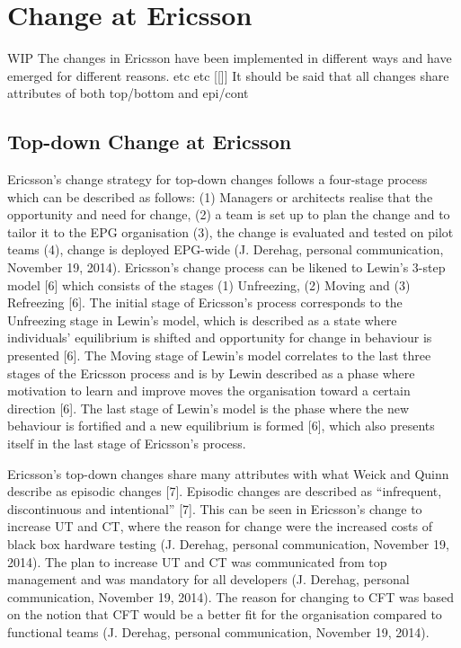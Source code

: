 \documentclass[final_report_innit.tex]{subfiles}
\begin{document}
\section{Change at Ericsson}
WIP
The changes in Ericsson have been implemented in different ways and have emerged for different reasons. etc etc [[]]
It should be said that all changes share attributes of both top/bottom and epi/cont

\subsection*{Top-down Change at Ericsson}
Ericsson’s change strategy for top-down changes follows a four-stage process which can be described as follows: (1) Managers or architects realise that the opportunity and need for change, (2) a team is set up to plan the change and to tailor it to the EPG organisation (3), the change is evaluated and tested on pilot teams (4), change is deployed EPG-wide (J. Derehag, personal communication, November 19, 2014). Ericsson’s change process can be likened to Lewin’s 3-step model [6] which consists of the stages (1) Unfreezing, (2) Moving and (3) Refreezing [6]. The initial stage of Ericsson’s process corresponds to the Unfreezing stage in Lewin’s model, which is described as a state where individuals’ equilibrium is shifted and opportunity for change in behaviour is presented [6]. The Moving stage of Lewin’s model correlates to the last three stages of the Ericsson process and is by Lewin described as a phase where motivation to learn and improve moves the organisation toward a certain direction [6]. The last stage of Lewin’s model is the phase where the new behaviour is fortified and a new equilibrium is formed [6], which also presents itself in the last stage of Ericsson’s process. 

Ericsson’s top-down changes share many attributes with what Weick and Quinn describe as episodic changes [7]. Episodic changes are described as “infrequent, discontinuous and intentional” [7]. This can be seen in Ericsson’s change to increase UT and CT, where the reason for change were the increased costs of black box hardware testing (J. Derehag, personal communication, November 19, 2014). The plan to increase UT and CT was communicated from top management and was mandatory for all developers (J. Derehag, personal communication, November 19, 2014). The reason for changing to CFT was based on the notion that CFT would be a better fit for the organisation compared to functional teams (J. Derehag, personal communication, November 19, 2014). 
\end{document}
